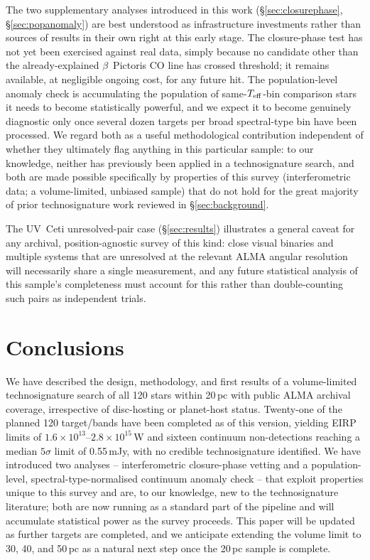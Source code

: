 \documentclass{openjournal}
\begin{document}
The two supplementary analyses introduced in this work
(\S\ref{sec:closurephase}, \S\ref{sec:popanomaly}) are best understood as
infrastructure investments rather than sources of results in their own
right at this early stage. The closure-phase test has not yet been
exercised against real data, simply because no candidate other than the
already-explained $\beta$~Pictoris CO line has crossed threshold; it
remains available, at negligible ongoing cost, for any future hit. The
population-level anomaly check is accumulating the population of
same-$T_{\rm eff}$-bin comparison stars it needs to become statistically
powerful, and we expect it to become genuinely diagnostic only once
several dozen targets per broad spectral-type bin have been processed.
We regard both as a useful methodological contribution independent of
whether they ultimately flag anything in this particular sample: to our
knowledge, neither has previously been applied in a technosignature
search, and both are made possible specifically by properties of this
survey (interferometric data; a volume-limited, unbiased sample) that do
not hold for the great majority of prior technosignature work reviewed in
\S\ref{sec:background}.

The UV~Ceti unresolved-pair case (\S\ref{sec:results}) illustrates a
general caveat for any archival, position-agnostic survey of this kind:
close visual binaries and multiple systems that are unresolved at the
relevant ALMA angular resolution will necessarily share a single
measurement, and any future statistical analysis of this sample's
completeness must account for this rather than double-counting such
pairs as independent trials.

\section{Conclusions}
\label{sec:conclusions}

We have described the design, methodology, and first results of a
volume-limited technosignature search of all 120 stars within 20\,pc
with public ALMA archival coverage, irrespective of disc-hosting or
planet-host status. Twenty-one of the planned 120 target/bands have been
completed as of this version, yielding EIRP limits of
$1.6\times10^{13}$--$2.8\times10^{15}$\,W and sixteen continuum
non-detections reaching a median $5\sigma$ limit of 0.55\,mJy, with no
credible technosignature identified. We have introduced two analyses
-- interferometric closure-phase vetting and a population-level,
spectral-type-normalised continuum anomaly check -- that exploit
properties unique to this survey and are, to our knowledge, new to the
technosignature literature; both are now running as a standard part of
the pipeline and will accumulate statistical power as the survey
proceeds. This paper will be updated as further targets are completed,
and we anticipate extending the volume limit to 30, 40, and 50\,pc as a
natural next step once the 20\,pc sample is complete.
\end{document}
